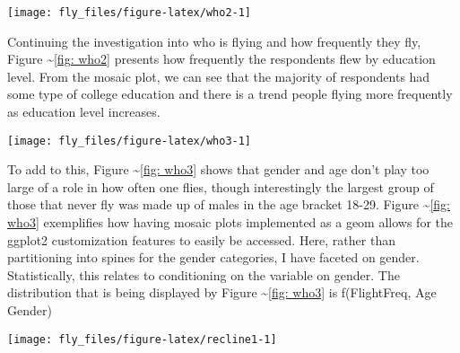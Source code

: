 \begin{Schunk}


\begin{center}\texttt{[image: fly\_files/figure-latex/who2-1]} \end{center}

\end{Schunk}

Continuing the investigation into who is flying and how frequently they
fly, Figure \textasciitilde{}\ref{fig: who2} presents how frequently the
respondents flew by education level. From the mosaic plot, we can see
that the majority of respondents had some type of college education and
there is a trend people flying more frequently as education level
increases.

\begin{Schunk}


\begin{center}\texttt{[image: fly\_files/figure-latex/who3-1]} \end{center}

\end{Schunk}

To add to this, Figure \textasciitilde{}\ref{fig: who3} shows that
gender and age don't play too large of a role in how often one flies,
though interestingly the largest group of those that never fly was made
up of males in the age bracket 18-29. Figure
\textasciitilde{}\ref{fig: who3} exemplifies how having mosaic plots
implemented as a geom allows for the ggplot2 customization features to
easily be accessed. Here, rather than partitioning into spines for the
gender categories, I have faceted on gender. Statistically, this relates
to conditioning on the variable on gender. The distribution that is
being displayed by Figure \textasciitilde{}\ref{fig: who3} is
f(FlightFreq, Age \textbar{}Gender)

\begin{Schunk}


\begin{center}\texttt{[image: fly\_files/figure-latex/recline1-1]} \end{center}

\end{Schunk}

